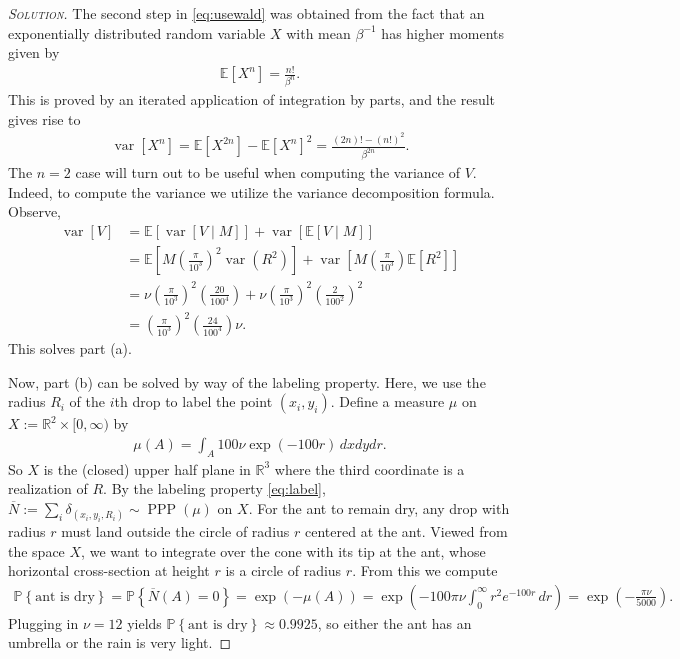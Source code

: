 \documentclass[11pt]{article}
\newenvironment{soln}{\begin{proof}[\textsc{Solution}]}{\renewcommand{\qedsymbol}{$\blacklozenge$}\end{proof}}
\begin{document}
\begin{example}
\begin{soln}
	The second step in \eqref{eq:usewald} was obtained from the fact that an exponentially distributed random variable $X$ with mean $\beta^{-1}$ has higher moments given by
	\begin{align}
		\mathbb{E}\left[ X^n \right] = \frac{n!}{\beta^n}.
	\end{align}
	This is proved by an iterated application of integration by parts, and the result gives rise to 
	\begin{align}
		\operatorname{var}\left[ X^n \right] = \mathbb{E}\left[ X^{2n} \right] - \mathbb{E}\left[ X^n \right]^2 = \frac{(2n)! - (n!)^2}{\beta^{2n}}.
	\end{align}
	The $n=2$ case will turn out to be useful when computing the variance of $V$.
	\newpage
	Indeed, to compute the variance we utilize the variance decomposition formula. Observe,
	\begin{align}
		\operatorname{var}[V] &= \mathbb{E}\left[ \operatorname{var}[V \mid M]\right] + \operatorname{var}\left[ \mathbb{E}[V \mid M ]\right]\\
		&= \mathbb{E}\left[ M\left(\frac{\pi}{10^3}\right)^2\operatorname{var}(R^2)\right] + \operatorname{var}\left[ M\left(\frac{\pi}{10^3}\right)\mathbb{E}[R^2]\right]\\
		&= \nu \left(\frac{\pi}{10^3}\right)^2 \left(\frac{20}{100^4}\right) + \nu\left(\frac{\pi}{10^3}\right)^2 \left(\frac{2}{100^2}\right)^2\\
		&= \left(\frac{\pi}{10^3}\right)^2\left(\frac{24}{100^4}\right)\nu.
	\end{align}
	This solves part (a).
	
	Now, part (b) can be solved by way of the labeling property. Here, we use the radius $R_i$ of the $i$th drop to label the point $(x_i,y_i)$. Define a measure $\mu$ on $X:=\mathbb{R}^2\times [0,\infty)$ by
	\begin{align}
		\mu(A) = \int_A\! 100\nu\exp(-100r)\, dxdydr.
	\end{align} 
	So $X$ is the (closed) upper half plane in $\mathbb{R}^3$ where the third coordinate is a realization of $R$. By the labeling property \eqref{eq:label}, $\overline{N} := \sum_i \delta_{(x_i,y_i,R_i)} \sim \operatorname{PPP}(\mu)$ on $X$. For the ant to remain dry, any drop with radius $r$ must land outside the circle of radius $r$ centered at the ant. Viewed from the space $X$, we want to integrate over the cone with its tip at the ant, whose horizontal cross-section at height $r$ is a circle of radius $r$. From this we compute
	\begin{align}
		\mathbb{P}\left\{\text{ant is dry}\right\} = \mathbb{P}\left\{\overline{N}(A) = 0\right\}
		= \exp(-\mu(A))
		= \exp\left(-100\pi\nu\int_0^\infty\! r^2e^{-100r}\,dr\right)
		= \exp\left( -\frac{\pi\nu}{5000} \right).
	\end{align}
	Plugging in $\nu = 12$ yields $\mathbb{P}\left\{\text{ant is dry}\right\} \approx 0.9925$, so either the ant has an umbrella or the rain is very light.
\end{soln}
\end{example}
\end{document}
